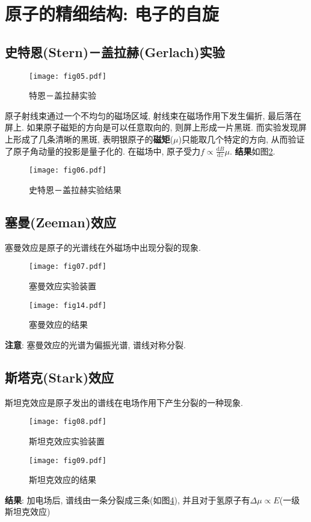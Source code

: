 \section{原子的精细结构: 电子的自旋}
\subsection{史特恩(Stern)－盖拉赫(Gerlach)实验}
\begin{figure}[!htb]
\centering
\texttt{[image: fig05.pdf]}
\caption{\label{fig05}特恩－盖拉赫实验}
\end{figure}
原子射线束通过一个不均匀的磁场区域, 射线束在磁场作用下发生偏折, 最后落在屏上. 如果原子磁矩的方向是可以任意取向的, 则屏上形成一片黑斑. 而实验发现屏上形成了几条清晰的黑斑, 表明银原子的\textbf{磁矩}($\mu$)只能取几个特定的方向, 从而验证了原子角动量的投影是量子化的.  在磁场中, 原子受力$f\varpropto\frac{\textrm{d}B}{\textrm{d}z}\mu$. \textbf{结果}如图\ref{fig06}.
\begin{figure}[!htb]
\centering
\texttt{[image: fig06.pdf]}
\caption{\label{fig06}史特恩－盖拉赫实验结果}
\end{figure}


\subsection{塞曼(Zeeman)效应}
塞曼效应是原子的光谱线在外磁场中出现分裂的现象. 
\begin{figure}[!htb]
\begin{minipage}[b]{0.48\textwidth}
\centering
\texttt{[image: fig07.pdf]}
\caption{\label{fig08}塞曼效应实验装置}
\end{minipage}%
\begin{minipage}[b]{0.48\textwidth}
\centering
\texttt{[image: fig14.pdf]}
\caption{\label{fig09}塞曼效应的结果}
\end{minipage}
\end{figure}
\textbf{注意}: 塞曼效应的光谱为偏振光谱, 谱线对称分裂. 

\subsection{斯塔克(Stark)效应}
斯坦克效应是原子发出的谱线在电场作用下产生分裂的一种现象. 
\begin{figure}[!htb]
\begin{minipage}[b]{0.48\textwidth}
\centering
\texttt{[image: fig08.pdf]}
\caption{\label{fig08}斯坦克效应实验装置}
\end{minipage}%
\begin{minipage}[b]{0.48\textwidth}
\centering
\texttt{[image: fig09.pdf]}
\caption{\label{fig09}斯坦克效应的结果}
\end{minipage}
\end{figure}
\textbf{结果}: 加电场后, 谱线由一条分裂成三条(如图\ref{fig09}), 并且对于氢原子有$\Delta\mu\propto E$(一级斯坦克效应)
